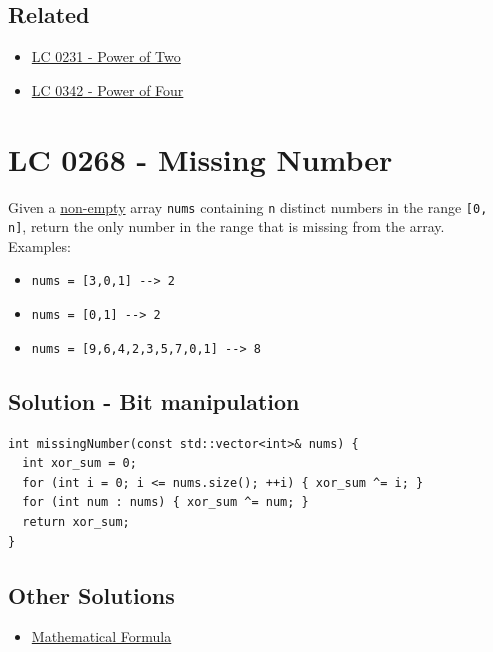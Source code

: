 \subsection*{Related}
\begin{itemize}
\item \hyperref[lc0231]{LC 0231 - Power of Two}
\item \hyperref[lc0342]{LC 0342 - Power of Four}
\end{itemize}

\section{LC 0268 - Missing Number}
Given a \ul{non-empty} array {\colorbox{CodeBackground}{\lstinline|nums|}} containing {\colorbox{CodeBackground}{\lstinline|n|}} distinct numbers in the range {\colorbox{CodeBackground}{\lstinline|[0, n]|}}, return the only number in the range that is missing from the array.\\

Examples:
\begin{itemize}
\item {\colorbox{CodeBackground}{\lstinline|nums = [3,0,1] --> 2|}}
\item {\colorbox{CodeBackground}{\lstinline|nums = [0,1] --> 2|}}
\item {\colorbox{CodeBackground}{\lstinline|nums = [9,6,4,2,3,5,7,0,1] --> 8|}}
\end{itemize}

\subsection*{Solution - Bit manipulation}\label{solution:lc0268_bit_manipulation}
\begin{lstlisting}
int missingNumber(const std::vector<int>& nums) {
  int xor_sum = 0;
  for (int i = 0; i <= nums.size(); ++i) { xor_sum ^= i; }
  for (int num : nums) { xor_sum ^= num; }
  return xor_sum;
}
\end{lstlisting}

\subsection*{Other Solutions}
\begin{itemize}
\item \hyperref[solution:lc0268_mathematical_formula]{Mathematical Formula}
\end{itemize}

